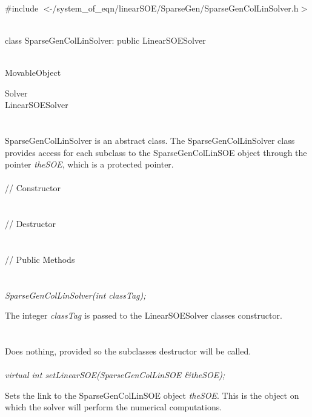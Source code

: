 
   \\
\#include $<\tilde{ }$/system\_of\_eqn/linearSOE/SparseGen/SparseGenColLinSolver.h$>$  


  \\
class SparseGenColLinSolver: public LinearSOESolver  


 \\
MovableObject 

\indent\indent  Solver \\
\indent\indent\indent LinearSOESolver \\
\indent\indent\indent{} \\

  \\
\indent SparseGenColLinSolver is an abstract class.  The SparseGenColLinSolver
class provides access for each subclass to the SparseGenColLinSOE object
through the pointer {\em theSOE}, which is a protected pointer. \\

  \\
\indent\indent // Constructor \\
\indent{}  \\ \\
\indent\indent // Destructor \\
\indent{}\\  \\
\indent\indent // Public Methods \\
\indent{} \\

  \\
{\em SparseGenColLinSolver(int classTag);}  

The integer {\em classTag} is passed to the LinearSOESolver classes
constructor. \\ 

 \\
\\ 
Does nothing, provided so the subclasses destructor will be called. \\

  \\
{\em virtual int setLinearSOE(SparseGenColLinSOE \&theSOE);} 

Sets the link to the SparseGenColLinSOE object {\em theSOE}. This is the
object on which the solver will perform the numerical computations. \\




